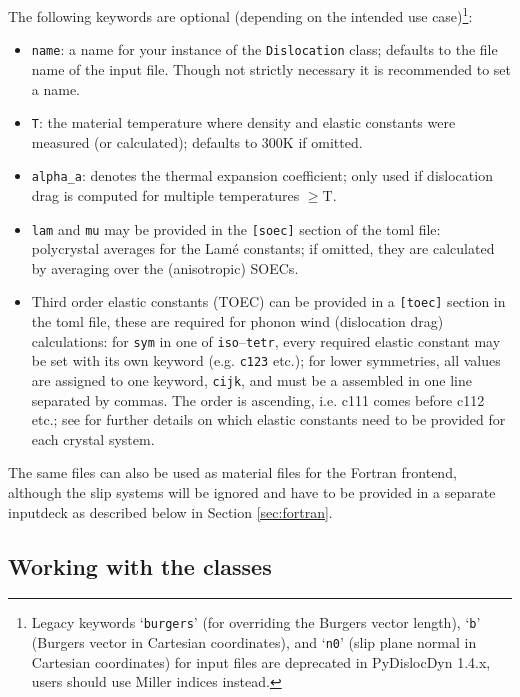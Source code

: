 \documentclass[11pt,letterpaper,oneside]{article}
\begin{document}
\noindent
The following keywords are optional (depending on the intended use case)\footnote{Legacy keywords `\texttt{burgers}' (for overriding the Burgers vector length), `\texttt{b}' (Burgers vector in Cartesian coordinates), and `\texttt{n0}' (slip plane normal in Cartesian coordinates) for input files are deprecated in PyDislocDyn 1.4.x, users should use Miller indices instead.}:
\begin{itemize}
\item \verb|name|: a name for your instance of the \verb|Dislocation| class; defaults to the file name of the input file.
Though not strictly necessary it is recommended to set a name.

\item \verb|T|: the material temperature where density and elastic constants were measured (or calculated); defaults to 300K if omitted.

\item \verb|alpha_a|: denotes the thermal expansion coefficient; only used if dislocation drag is computed for multiple temperatures $\ge$T.

\item \verb|lam| and \verb|mu| may be provided in the \verb|[soec]| section of the toml file: polycrystal averages for the Lam\'e constants; if omitted, they are calculated by averaging over the (anisotropic) SOECs.

\item Third order elastic constants (TOEC) can be provided in a \verb|[toec]| section in the toml file, these are required for phonon wind (dislocation drag) calculations:
for \verb|sym| in one of \verb|iso|--\verb|tetr|, every required elastic constant may be set with its own keyword (e.g. \verb|c123| etc.);
for lower symmetries, all values are assigned to one keyword, \verb|cijk|, and must be a assembled in one line separated by commas.
The order is ascending, i.e. c111 comes before c112 etc.; see \cite{Brugger:1965} for further details on which elastic constants need to be provided for each crystal system.
\end{itemize}
The same files can also be used as material files for the Fortran frontend, although the slip systems will be ignored and have to be provided in a separate inputdeck as described below in Section \ref{sec:fortran}.


\subsection{Working with the classes}
\label{sec:classes}
\end{document}
